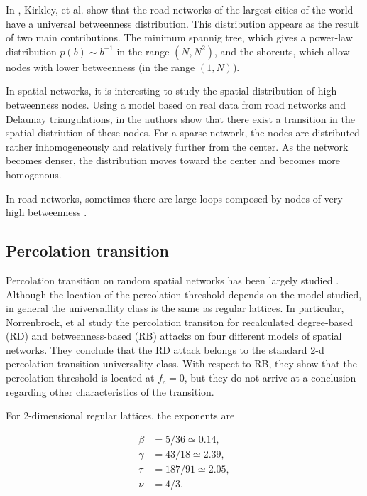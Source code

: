 \documentclass{article}
\begin{document}
In \cite{Kirkley2018FromGraphs}, Kirkley, et al. show that the road networks of the largest cities of the world have a universal betweenness distribution. This distribution appears as the result of two main contributions. The minimum spannig tree, which gives a power-law distribution $p(b) \sim b^{-1}$ in the range $(N,N^2)$, and the shorcuts, which allow nodes with lower betweenness (in the range $(1,N)$).

In spatial networks, it is interesting to study the spatial distribution of high betweenness nodes. Using a model based on real data from road networks and Delaunay triangulations, in \cite{Kirkley2018FromGraphs} the authors show that there exist a transition in the spatial distriution of these nodes. For a sparse network, the nodes are distributed rather inhomogeneously and relatively further from the center. As the network becomes denser, the distribution moves toward the center and becomes more homogenous.

In road networks, sometimes there are large loops composed by nodes of very high betweenness \cite{Lion2017}.

\subsection{Percolation transition}

Percolation transition on random spatial networks has been largely studied \cite{Melchert2013,Becker2009,Norrenbrock2016a}. Although the location of the percolation threshold depends on the model studied, in general the universaillity class is the same as regular lattices. In particular, Norrenbrock, et al \cite{Norrenbrock2016FragmentationAttacks} study the percolation transiton for recalculated degree-based (RD) and betweenness-based (RB) attacks on four different models of spatial networks. They conclude that the RD attack belongs to the standard 2-d percolation transition universality class. With respect to RB, they show that the percolation threshold is located at $f_c = 0$, but they do not arrive at a conclusion regarding other characteristics of the transition.

For 2-dimensional regular lattices, the exponents are 

\begin{align}
\beta &= 5/36\simeq 0.14, \\
\gamma &= 43/18\simeq 2.39, \\
\tau &= 187/91\simeq 2.05, \\
\nu &= 4/3.
\end{align}
\end{document}
